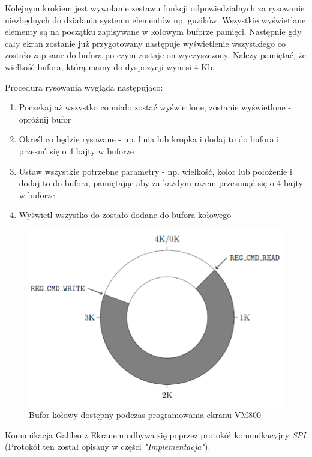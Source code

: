 \documentclass{xmgr}
\begin{document}
Kolejnym krokiem jest wywołanie zestawu funkcji odpowiedzialnych za rysowanie niezbędnych do działania systemu elementów np. guzików. Wszystkie wyświetlane elementy są na początku zapisywane w kołowym buforze pamięci. Następnie gdy cały ekran zostanie już przygotowany następuje wyświetlenie wszystkiego co zostało zapisane do bufora po czym zostaje on wyczyszczony. Należy pamiętać, że wielkość bufora, którą mamy do dyspozycji wynosi 4 Kb.

Procedura rysowania wygląda następująco:
\begin{enumerate}
	\item Poczekaj aż wszystko co miało zostać wyświetlone, zostanie wyświetlone - opróżnij bufor
	\item Określ co będzie rysowane - np. linia lub kropka i dodaj to do bufora i przesuń się o 4 bajty w buforze
	\item Ustaw wszystkie potrzebne parametry - np. wielkość, kolor lub położenie i dodaj to do bufora, pamiętając aby za każdym razem przesunąć się o 4 bajty w buforze
	\item Wyświetl wszystko do zostało dodane do bufora kołowego 
\end{enumerate}

\begin{figure}[!h]
    \centering
    \includegraphics[height=0.25\textheight]{images/buf.png}
    \caption{Bufor kołowy dostępny podczas programowania ekranu VM800}
\end{figure}

Komunikacja Galileo z Ekranem odbywa się poprzez protokół komunikacyjny \emph{SPI} (Protokół ten został opisany w części \emph{"Implementacja"}).
\end{document}
